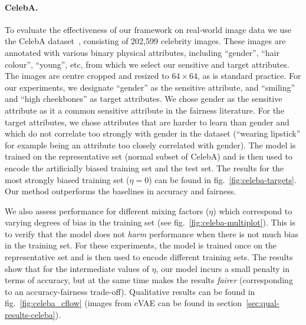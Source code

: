 \paragraph{CelebA.}
To evaluate the effectiveness of our framework on real-world image data we use the CelebA dataset~\citep{liu2015faceattributes}, consisting of 202,599 celebrity images.
These images are annotated with various binary physical  attributes, including ``gender'', ``hair colour'', ``young'', etc, from which we  select our sensitive and target attributes.
The images are centre cropped and resized to $64\times64$, as is standard practice.
For our experiments, we designate ``gender'' as the sensitive attribute,
and ``smiling'' and ``high cheekbones'' as target attributes.
We chose gender as the sensitive attribute as it a common sensitive attribute in the fairness literature.
For the target attributes, we chose attributes that are harder to learn than gender and which do not correlate too strongly with gender in the dataset
(``wearing lipstick'' for example being an attribute too closely correlated with gender).
The model is trained on the representative set (normal subset of CelebA)
and is then used to encode the artificially biased training set and the test set.
The results for the most strongly biased training set ($\eta=0$) can be found in fig.~\ref{fig:celeba-targets}.
Our method outperforms the baselines in accuracy and fairness.

We also assess performance for different mixing factors ($\eta$) which correspond to varying degrees of bias in the training set
(see fig.~\ref{fig:celeba-multiplot}).
This is to verify that the model does not \emph{harm} performance when there is not much bias in the training set.
For these experiments, the model is trained once on the representative set and is then used to encode different training sets.
The results show that for the intermediate values of $\eta$, our model incurs a small penalty in terms of accuracy,
but at the same time makes the results \emph{fairer} (corresponding to an accuracy-fairness trade-off). Qualitative results can be found in fig.~\ref{fig:celeba_cflow} (images from cVAE can be found in section~\ref{sec:qual-results-celeba}).

